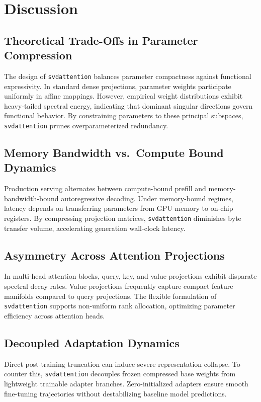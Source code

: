 \section{Discussion}

\subsection{Theoretical Trade-Offs in Parameter Compression}
The design of \texttt{svdattention} balances parameter compactness against functional expressivity. In standard dense projections, parameter weights participate uniformly in affine mappings. However, empirical weight distributions exhibit heavy-tailed spectral energy, indicating that dominant singular directions govern functional behavior. By constraining parameters to these principal subspaces, \texttt{svdattention} prunes overparameterized redundancy.

\subsection{Memory Bandwidth vs.\ Compute Bound Dynamics}
Production serving alternates between compute-bound prefill and memory-bandwidth-bound autoregressive decoding. Under memory-bound regimes, latency depends on transferring parameters from GPU memory to on-chip registers. By compressing projection matrices, \texttt{svdattention} diminishes byte transfer volume, accelerating generation wall-clock latency.

\subsection{Asymmetry Across Attention Projections}
In multi-head attention blocks, query, key, and value projections exhibit disparate spectral decay rates. Value projections frequently capture compact feature manifolds compared to query projections. The flexible formulation of \texttt{svdattention} supports non-uniform rank allocation, optimizing parameter efficiency across attention heads.

\subsection{Decoupled Adaptation Dynamics}
Direct post-training truncation can induce severe representation collapse. To counter this, \texttt{svdattention} decouples frozen compressed base weights from lightweight trainable adapter branches. Zero-initialized adapters ensure smooth fine-tuning trajectories without destabilizing baseline model predictions.

